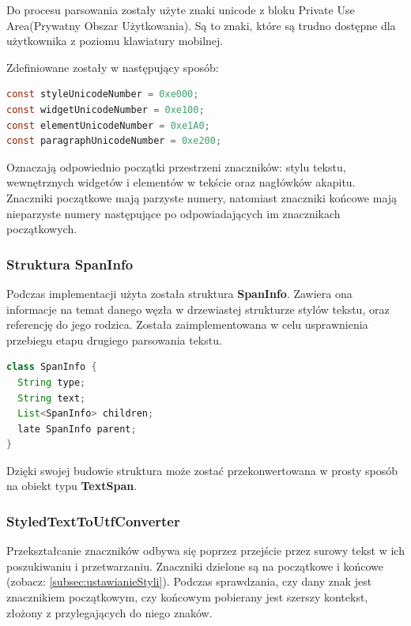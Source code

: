 Do procesu parsowania zostały użyte znaki unicode z bloku Private Use Area(Prywatny Obszar Użytkowania). Są to znaki, które są trudno dostępne dla użytkownika z poziomu klawiatury mobilnej.

\noindent Zdefiniowane zostały w następujący sposób:

\begin{lstlisting}[language=java]
const styleUnicodeNumber = 0xe000;
const widgetUnicodeNumber = 0xe100;
const elementUnicodeNumber = 0xe1A0;
const paragraphUnicodeNumber = 0xe200;
\end{lstlisting}

Oznaczają odpowiednio początki przestrzeni znaczników: stylu tekstu, wewnętrznych widgetów i elementów w tekście oraz nagłówków akapitu.
Znaczniki początkowe mają parzyste numery, natomiast znaczniki końcowe mają nieparzyste numery następujące po odpowiadających im znacznikach początkowych.

\newpage

\subsubsection{Struktura SpanInfo}

Podczas implementacji użyta została struktura \textbf{SpanInfo}. Zawiera ona informacje na temat danego węzła w drzewiastej strukturze stylów tekstu, oraz referencję do jego rodzica.
Została zaimplementowana w celu usprawnienia przebiegu etapu drugiego parsowania tekstu.

\begin{lstlisting}[language=java]
class SpanInfo {
  String type;
  String text;
  List<SpanInfo> children;
  late SpanInfo parent;
}
\end{lstlisting}

Dzięki swojej budowie struktura może zostać przekonwertowana w prosty sposób na obiekt typu \textbf{TextSpan}.

\subsubsection{StyledTextToUtfConverter}

Przekształcanie znaczników odbywa się poprzez przejście przez surowy tekst w ich poszukiwaniu i przetwarzaniu. Znaczniki dzielone są na początkowe i końcowe (zobacz: \ref{subsec:ustawianieStyli}). Podczas sprawdzania, czy dany znak jest znacznikiem początkowym, czy końcowym pobierany jest szerszy kontekst, złożony z przylegających do niego znaków.

